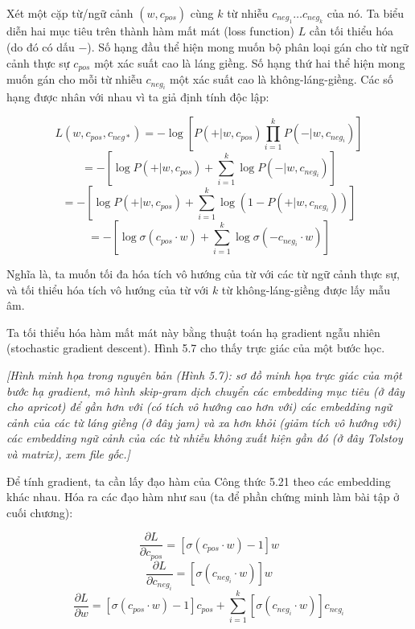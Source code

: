 Xét một cặp từ/ngữ cảnh $(w, c_{pos})$ cùng $k$ từ nhiễu $c_{neg_1} \ldots c_{neg_k}$ của nó. Ta biểu diễn hai mục tiêu trên thành hàm mất mát (loss function) $L$ cần tối thiểu hóa (do đó có dấu $-$). Số hạng đầu thể hiện mong muốn bộ phân loại gán cho từ ngữ cảnh thực sự $c_{pos}$ một xác suất cao là láng giềng. Số hạng thứ hai thể hiện mong muốn gán cho mỗi từ nhiễu $c_{neg_i}$ một xác suất cao là không-láng-giềng. Các số hạng được nhân với nhau vì ta giả định tính độc lập:

$$
L(w,c_{pos},c_{neg*}) = -\log \left[ P(+|w,c_{pos}) \prod_{i=1}^{k} P(-|w,c_{neg_i}) \right]
$$
$$
= -\left[ \log P(+|w,c_{pos}) + \sum_{i=1}^{k} \log P(-|w,c_{neg_i}) \right]
$$
$$
= -\left[ \log P(+|w,c_{pos}) + \sum_{i=1}^{k} \log \left(1-P(+|w,c_{neg_i})\right) \right]
$$
\begin{equation}
= -\left[ \log \sigma(c_{pos} \cdot w) + \sum_{i=1}^{k} \log \sigma(-c_{neg_i} \cdot w) \right] \tag{5.21}
\end{equation}

Nghĩa là, ta muốn tối đa hóa tích vô hướng của từ với các từ ngữ cảnh thực sự, và tối thiểu hóa tích vô hướng của từ với $k$ từ không-láng-giềng được lấy mẫu âm.

Ta tối thiểu hóa hàm mất mát này bằng thuật toán hạ gradient ngẫu nhiên (stochastic gradient descent). Hình 5.7 cho thấy trực giác của một bước học.

\textit{[Hình minh họa trong nguyên bản (Hình 5.7): sơ đồ minh họa trực giác của một bước hạ gradient, mô hình skip-gram dịch chuyển các embedding mục tiêu (ở đây cho \emph{apricot}) để gần hơn với (có tích vô hướng cao hơn với) các embedding ngữ cảnh của các từ láng giềng (ở đây \emph{jam}) và xa hơn khỏi (giảm tích vô hướng với) các embedding ngữ cảnh của các từ nhiễu không xuất hiện gần đó (ở đây \emph{Tolstoy} và \emph{matrix}), xem file gốc.]}

Để tính gradient, ta cần lấy đạo hàm của Công thức 5.21 theo các embedding khác nhau. Hóa ra các đạo hàm như sau (ta để phần chứng minh làm bài tập ở cuối chương):

\begin{equation}
\frac{\partial L}{\partial c_{pos}} = \left[\sigma(c_{pos} \cdot w)-1\right]w \tag{5.22}
\end{equation}
\begin{equation}
\frac{\partial L}{\partial c_{neg_i}} = \left[\sigma(c_{neg_i} \cdot w)\right]w \tag{5.23}
\end{equation}
\begin{equation}
\frac{\partial L}{\partial w} = \left[\sigma(c_{pos} \cdot w)-1\right]c_{pos} + \sum_{i=1}^{k}\left[\sigma(c_{neg_i} \cdot w)\right]c_{neg_i} \tag{5.24}
\end{equation}

